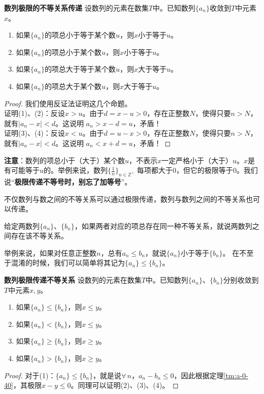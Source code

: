 \documentclass[12pt,UTF8]{ctexbook}
\begin{document}
\begin{appendix}
\begin{tm}{\textbf{数列极限的不等关系传递}}\label{tm:a-0-40}
    设数列的元素在数集$T$中。已知数列$\{a_n\}$收敛到$T$中元素$x$。
    \begin{enumerate}
        \item 如果$\{a_n\}$的项总小于等于某个数$u$，则$x$小于等于$u$。
        \item 如果$\{a_n\}$的项总小于某个数$u$，则$x$小于等于$u$。
        \item 如果$\{a_n\}$的项总大于等于某个数$u$，则$x$大于等于$u$。
        \item 如果$\{a_n\}$的项总大于某个数$u$，则$x$大于等于$u$。
    \end{enumerate}
\end{tm}
\begin{proof}
    我们使用反证法证明这几个命题。\\
    证明(1)、(2)：反设$x > u$。由于$d = x - u > 0$，存在正整数$N$，使得只要$n>N$，就有$|a_n - x| < d$。这说明
    $a_n > x - d = u$，矛盾！\\
    证明(3)、(4)：反设$x < u$。由于$d = u - x > 0$，存在正整数$N$，使得只要$n>N$，就有$|a_n - x| < d$。这说明
    $a_n < x + d = u$，矛盾！
\end{proof}

\textbf{注意}：数列的项总小于（大于）某个数$u$，不表示$x$一定严格小于（大于）$u$。$x$是有可能等于$u$的。举例来说，数列$\{\frac{1}{n}\}_{n\in\mathbb{Z}^+}$
每项都大于$0$，但它的极限等于$0$。我们说“\textbf{极限传递不等号时，别忘了加等号}”。

不仅数列与数之间的不等关系可以通过极限传递，数列与数列之间的不等关系也可以传递。

\begin{df}
    给定两数列$\{a_n\}$、$\{b_n\}$，如果两者对应的项总存在同一种不等关系，就说两数列之间存在该不等关系。
\end{df}
举例来说，如果对任意正整数$n$，总有$a_n \leqslant b_n$，就说$\{a_n\}$小于等于$\{b_n\}$。
在不至于混淆的时候，我们可以简单将其记为$\{a_n\} \leqslant \{b_n\}$。

\begin{tm}{\textbf{数列极限传递不等关系}}\label{tm:a-0-45}
    设数列的元素在数集$T$中。已知数列$\{a_n\}$、$\{b_n\}$分别收敛到$T$中元素$x,y$。
    \begin{enumerate}
        \item 如果$\{a_n\} \leqslant \{b_n\}$，则$x\leqslant y$。
        \item 如果$\{a_n\} < \{b_n\}$，则$x\leqslant y$。
        \item 如果$\{a_n\} \geqslant \{b_n\}$，则$x\geqslant y$。
        \item 如果$\{a_n\} > \{b_n\}$，则$x\geqslant y$。
    \end{enumerate}
\end{tm}
\begin{proof}
    对于(1)：$\{a_n\} \leqslant \{b_n\}$，就是说$\forall\,n$，$a_n - b_n \leqslant 0$，因此根据定理\ref{tm:a-0-40}，其极限$x - y\leqslant 0$。同理可以证明(2)、(3)、(4)。
\end{proof}


\end{appendix}
\end{document}
